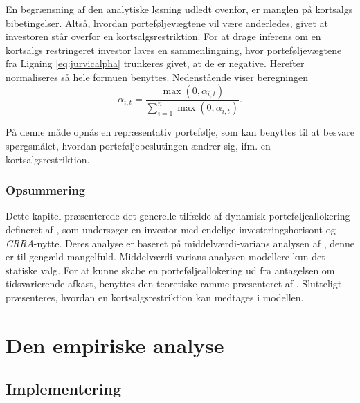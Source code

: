 \documentclass[
  a4paper,
  oneside]{memoir}
\begin{document}
En begrænsning af den analytiske løsning udledt ovenfor, er manglen på kortsalgs bibetingelser. Altså, hvordan porteføljevægtene vil være anderledes, givet at investoren står overfor en kortsalgsrestriktion. For at drage inferens om en kortsalgs restringeret investor laves en sammenlingning, hvor porteføljevægtene fra Ligning \eqref{eq:jurvicalpha} trunkeres givet, at de er negative. Herefter normaliseres så hele formuen benyttes. Nedenstående viser beregningen
\begin{equation}
\alpha_{i,t}=\frac{\max(0,\alpha_{i,t})}{\sum_{i=1}^n \max(0,\alpha_{i,t})}.\label{eq:kortsalgsrestr}
\end{equation}

På denne måde opnås en repræsentativ portefølje, som kan benyttes til at besvare spørgsmålet, hvordan porteføljebeslutingen ændrer sig, ifm. en kortsalgsrestriktion.

\hypertarget{opsummering-1}{%
\section{Opsummering}\label{opsummering-1}}

Dette kapitel præsenterede det generelle tilfælde af dynamisk porteføljeallokering defineret af \citep{CampVic2003}, som undersøger en investor med endelige investeringshorisont og \emph{CRRA}-nytte. Deres analyse er baseret på middelværdi-varians analysen af \citep{Markowitz1952}, denne er til gengæld mangelfuld. Middelværdi-varians analysen modellere kun det statiske valg. For at kunne skabe en porteføljeallokering ud fra antagelsen om tidsvarierende afkast, benyttes den teoretiske ramme præsenteret af \citep{JurVic2011}. Slutteligt præsenteres, hvordan en kortsalgsrestriktion kan medtages i modellen.

\part{Den empiriske analyse}

\hypertarget{imple}{%
\chapter{Implementering}\label{imple}}
\end{document}
